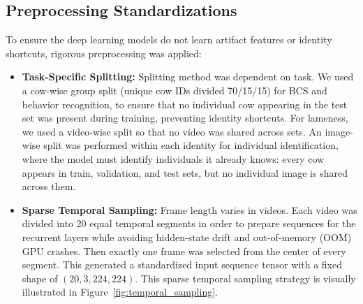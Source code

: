 \subsection{Preprocessing Standardizations}
To ensure the deep learning models do not learn artifact features or identity shortcuts, rigorous preprocessing was applied:
\begin{itemize}
    \item \textbf{Task-Specific Splitting:} Splitting method was dependent on task. We used a cow-wise group split (unique cow IDs divided 70/15/15) for BCS and behavior recognition, to ensure that no individual cow appearing in the test set was present during training, preventing identity shortcuts. For lameness, we used a video-wise split so that no video was shared across sets. An image-wise split was performed within each identity for individual identification, where the model must identify individuals it already knows: every cow appears in train, validation, and test sets, but no individual image is shared across them.
    \item \textbf{Sparse Temporal Sampling:} Frame length varies in videos. Each video was divided into 20 equal temporal segments in order to prepare sequences for the recurrent layers while avoiding hidden-state drift and out-of-memory (OOM) GPU crashes. Then exactly one frame was selected from the center of every segment. This generated a standardized input sequence tensor with a fixed shape of $(20, 3, 224, 224)$. This sparse temporal sampling strategy is visually illustrated in Figure~\ref{fig:temporal_sampling}.

    \begin{figure}[H]
    \centering
\end{figure}
\end{itemize}
